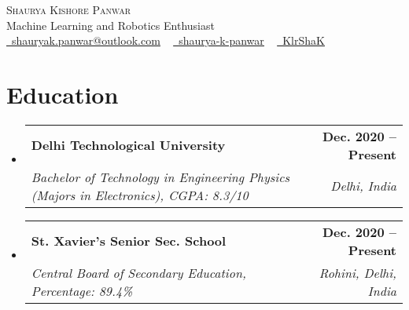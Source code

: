 \documentclass[letterpaper,11pt]{article}
\makeatletter
\newcommand{\resumeSubheading}[4]{
  \vspace{-2pt}\item
    \begin{tabular*}{1.0\textwidth}[t]{l@{\extracolsep{\fill}}r}
      \textbf{#1} & \textbf{\small #2} \\
      \textit{\small#3} & \textit{\small #4} \\
    \end{tabular*}\vspace{-7pt}
}
\newcommand{\resumeSubHeadingListStart}{\begin{itemize}[leftmargin=0.0in, label={}]}
\newcommand{\resumeSubHeadingListEnd}{\end{itemize}}
\makeatother
\begin{document}
\setlength{\footskip}{5pt}
\begin{center}
    {\Huge \scshape Shaurya Kishore Panwar} \\ \vspace{2pt}
    Machine Learning and Robotics Enthusiast \\ \vspace{3pt}
    \href{mailto:shauryak.panwar@outlook.com}{\raisebox{-0.2\height}\faEnvelope\  \underline{shauryak.panwar@outlook.com}} ~ 
    \href{https://linkedin.com/in/shaurya-k-panwar/}{\raisebox{-0.2\height}\faLinkedin\ \underline{shaurya-k-panwar}}  ~
    \href{https://github.com/KlrShaK}{\raisebox{-0.2\height}\faGithub\ \underline{KlrShaK}}
    \vspace{-8pt}
\end{center}


\section{Education}
  \resumeSubHeadingListStart
    \resumeSubheading
      {Delhi Technological University}{Dec. 2020 -- Present}
      {Bachelor of Technology in Engineering Physics (Majors in Electronics), CGPA: 8.3/10}{Delhi, India}
    \resumeSubheading
      {St. Xavier's Senior Sec. School}{Dec. 2020 -- Present}
      {Central Board of Secondary Education, Percentage: 89.4\%}{Rohini, Delhi, India}
  \resumeSubHeadingListEnd

\end{document}
